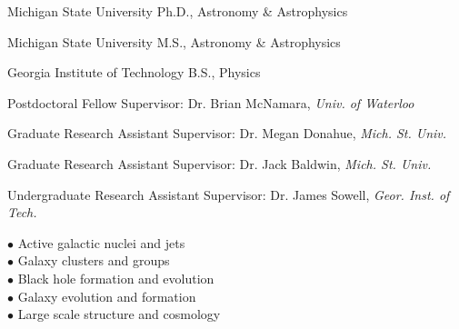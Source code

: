 \documentclass[12pt]{cv}
\begin{document}
\begin{llist}


Michigan State University
Ph.D., Astronomy \& Astrophysics

Michigan State University
M.S., Astronomy \& Astrophysics

Georgia Institute of Technology
B.S., Physics


Postdoctoral Fellow
Supervisor: Dr. Brian McNamara, {\textit{Univ. of Waterloo}}

Graduate Research Assistant
Supervisor: Dr. Megan Donahue, {\textit{Mich. St. Univ.}}

Graduate Research Assistant
Supervisor: Dr. Jack Baldwin, {\textit{Mich. St. Univ.}}

Undergraduate Research Assistant
Supervisor: Dr. James Sowell, {\textit{Geor. Inst. of Tech.}}


$\bullet$ Active galactic nuclei and jets\\
$\bullet$ Galaxy clusters and groups\\
$\bullet$ Black hole formation and evolution\\
$\bullet$ Galaxy evolution and formation\\
$\bullet$ Large scale structure and cosmology


\end{llist}
\end{document}
